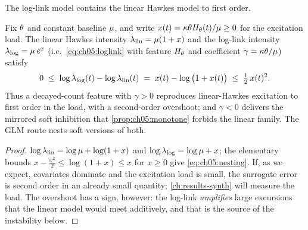 The log-link model contains the linear Hawkes model to first order.

\begin{proposition}\label{prop:ch05:nesting}
Fix $\theta$ and constant baseline $\mu$, and write $x(t) =
\kappa\theta H_{\theta}(t)/\mu \ge 0$ for the excitation load. The
linear Hawkes intensity $\lambda_{\mathrm{lin}} = \mu(1 + x)$ and the
log-link intensity $\lambda_{\mathrm{log}} = \mu\, e^{x}$ (i.e.\
\cref{eq:ch05:loglink} with feature $H_\theta$ and coefficient $\gamma =
\kappa\theta/\mu$) satisfy
\begin{equation}\label{eq:ch05:nesting}
0 \;\le\; \log \lambda_{\mathrm{log}}(t) - \log \lambda_{\mathrm{lin}}(t)
\;=\; x(t) - \log\big(1 + x(t)\big) \;\le\; \tfrac{1}{2}\,x(t)^2 .
\end{equation}
Thus a decayed-count feature with $\gamma > 0$ reproduces linear-Hawkes
excitation to first order in the load, with a second-order overshoot; and
$\gamma < 0$ delivers the mirrored soft inhibition that
\cref{prop:ch05:monotone} forbids the linear family. The GLM route nests
soft versions of both.
\end{proposition}

\begin{proof}
$\log\lambda_{\mathrm{lin}} = \log\mu + \log(1+x)$ and
$\log\lambda_{\mathrm{log}} = \log\mu + x$; the elementary bounds $x -
\tfrac{x^2}{2} \le \log(1+x) \le x$ for $x \ge 0$ give
\cref{eq:ch05:nesting}. If, as we expect, covariates dominate and the
excitation load is small, the surrogate error is second order in an
already small quantity; \cref{ch:results-synth} will measure the load.
The overshoot has a
sign, however: the log-link \emph{amplifies} large excursions that the
linear model would meet additively, and that is the source of the
instability below.
\end{proof}

